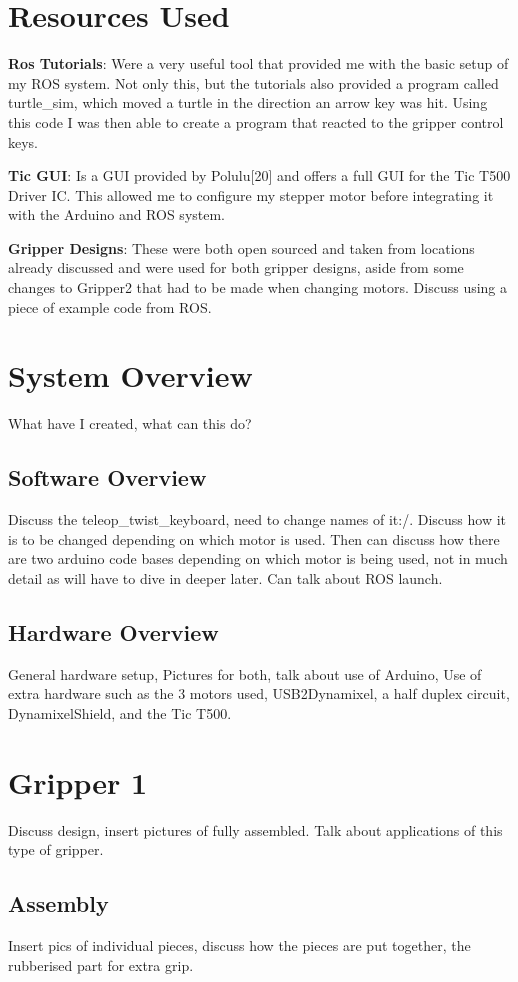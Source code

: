 \documentclass{l4proj}
\begin{document}
\section{Resources Used}
\textbf{Ros Tutorials}: Were a very useful tool that provided me with the basic setup of my ROS system. Not only this, but the tutorials also provided a program called turtle_sim, which moved a turtle in the direction an arrow key was hit. Using this code I was then able to create a program that reacted to the gripper control keys. 

\textbf{Tic GUI}: Is a GUI provided by Polulu[20] and offers a full GUI for the Tic T500 Driver IC. This allowed me to configure my stepper motor before integrating it with the Arduino and ROS system. 

\textbf{Gripper Designs}: These were both open sourced and taken from locations already discussed and were used for both gripper designs, aside from some changes to Gripper2 that had to be made when changing motors. 
Discuss using a piece of example code from ROS. 


\section{System Overview}
What have I created, what can this do?
\subsection{Software Overview}
Discuss the teleop\_twist\_keyboard, need to change names of it:/. Discuss how it is to be changed depending on which motor is used. Then can discuss how there are two arduino code bases depending on which motor is being used, not in much detail as will have to dive in deeper later. 
Can talk about ROS launch. 
\subsection{Hardware Overview} 
General hardware setup, Pictures for both, talk about use of Arduino, Use of extra hardware such as the 3 motors used, USB2Dynamixel, a half duplex circuit, DynamixelShield, and the Tic T500. 



\section{Gripper 1}
Discuss design, insert pictures of fully assembled. Talk about applications of this type of gripper.
\subsection{Assembly}
Insert pics of individual pieces, discuss how the pieces are put together, the rubberised part for extra grip.
\end{document}
